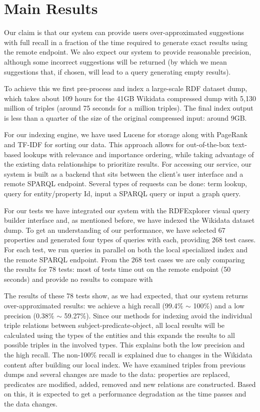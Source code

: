 \section{Main Results}

Our claim is that our system can provide users over-approximated suggestions with full recall in a fraction of the time required to
generate exact results using the remote endpoint. We also expect our system to provide reasonable precision, although some incorrect suggestions will be returned (by which we mean suggestions that, if chosen, will lead to a query generating empty results).

To achieve this we first pre-process and index a large-scale RDF dataset dump, which takes about 109 hours for the 41GB Wikidata compressed dump with 5,130 million of triples (around 75 seconds for a million triples). The final index output is less than a quarter of the size of the original compressed input: around 9GB. 

For our indexing engine, we have used Lucene for storage along with PageRank and TF-IDF for sorting our data. This approach allows for out-of-the-box text-based lookups with relevance and importance ordering, while taking advantage of the existing data relationships to prioritize results. For accessing our service, our system is built as a backend that sits between the client's user interface and a remote SPARQL endpoint. Several types of requests can be done: term lookup, query for entity/property Id, input a SPARQL query or input a graph query.

For our tests we have integrated our system with the RDFExplorer visual query builder interface and, as mentioned before, we have indexed the Wikidata dataset dump. To get an understanding of our performance, we have selected 67 properties and generated four types of queries with each, providing 268 test cases. For each test, we run queries in parallel on both the local specialized index and the remote SPARQL endpoint. From the 268 test cases we are only comparing the results for 78 tests: most of tests time out on the remote endpoint (50 seconds) and provide no results to compare with 

The results of these 78 tests show, as we had expected, that our system returns over-approximated results: we achieve a high recall (99.4\% $\sim$ 100\%) and a low precision (0.38\% $\sim$ 59.27\%). Since our methods for indexing avoid the individual triple relations between subject-predicate-object, all local results will be calculated using the types of the entities and this expands the results to all possible triples in the involved types. This explains both the low precision and the high recall. The non-100\% recall is explained due to changes in the Wikidata content after building our local index. We have examined triples from previous dumps and several changes are made to the data: properties are replaced, predicates are modified, added, removed and new relations are constructed. Based on this, it is expected to get a performance degradation as the time passes and the data changes.

